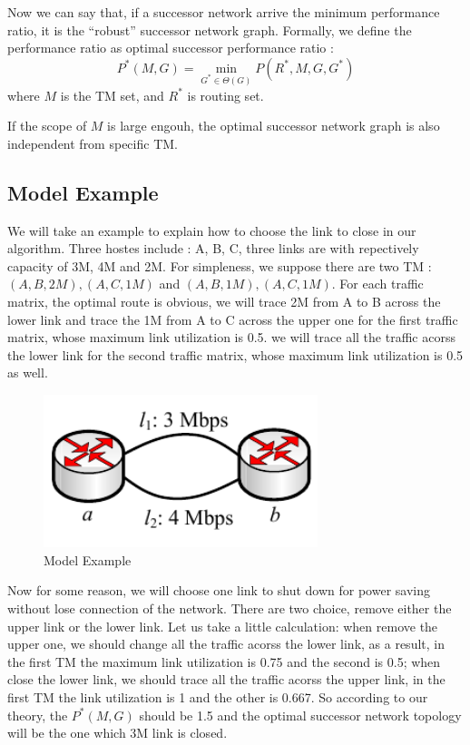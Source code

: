 \documentclass[conference]{IEEEtran}
\begin{document}
Now we can say that, if a successor network arrive the minimum performance ratio, it is the ``robust'' successor 
network graph. Formally, we define the performance ratio as optimal successor performance ratio :
\begin{equation}
	P^{*}(M, G) = \min_{G^* \in \Theta(G)} P(R^*, M, G, G^*)
\end{equation}
where $M$ is the TM set, and $R^*$ is routing set. 

If the scope of $M$ is large engouh, the optimal successor network graph is also independent from specific TM. 

\subsection{Model Example}
We will take an example to explain how to choose the link to close in our algorithm.
Three hostes include : A, B, C, three links are with repectively capacity of 3M, 4M and 2M. For simpleness, we suppose 
there are two TM : ${(A,B,2M), (A,C,1M)}$ and ${(A,B,1M), (A,C,1M)}$. For each traffic matrix, the optimal route is 
obvious, we will trace 2M from A to B across the lower link and trace the 1M from A to C across the upper one 
for the first traffic matrix, whose maximum link utilization is 0.5. we will trace all the traffic acorss the
lower link for the second traffic matrix, whose maximum link utilization is 0.5 as well.


\begin{figure}[!t]
\centering
\vspace*{0.1in}
\includegraphics[width=8cm]{3-nodes-example}
\caption{Model Example}
\label{label}
\vspace*{0.1in}
\end{figure}


Now for some reason, we will choose one link to shut down for power saving without lose connection of the network. 
There are two choice, remove either the upper link or the lower link. Let us take a little calculation: when 
remove the upper one, we should change all the traffic acorss the lower link, as a result, in the first  
TM the maximum link utilization is 0.75 and the second is 0.5; when close the lower link, we should trace all the 
traffic acorss the upper link, in the first TM the link utilization is 1 and the other is 0.667. 
So according to our theory, the $P^{*}(M, G)$ should be 1.5 and the optimal successor network topology will be
the one which 3M link is closed.
\end{document}
